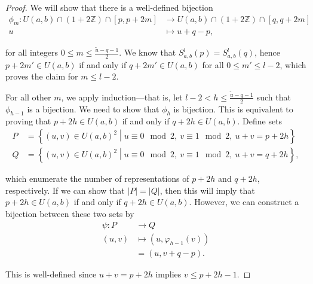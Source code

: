 \documentclass{amsart}
\newcommand{\ZZ}{\mathbb{Z}}
\theoremstyle{theorem}
\theoremstyle{definition}
\begin{document}
\begin{proof}
We will show that there is a well-defined bijection
	\begin{align*}
    \phi_m: U(a,b) \cap (1 + 2\ZZ) \cap [p, p + 2m] &\rightarrow U(a,b) \cap (1 + 2\ZZ) \cap [q, q + 2m] \\
    u &\mapsto u + q - p,
    \end{align*}
    
\noindent for all integers $0 \leq m \leq \frac{\tilde{u} - q - 1}{2}$. We know that $S^l_{a,b}(p) = S^l_{a,b}(q)$, hence $p + 2m' \in U(a,b)$ if and only if $q + 2m' \in U(a,b)$ for all $0 \leq m' \leq l - 2$, which proves the claim for $m \leq l - 2$.

For all other $m$, we apply induction---that is, let $l - 2 < h \leq \frac{\tilde{u} - q - 1}{2}$ such that $\phi_{h - 1}$ is a bijection. We need to show that $\phi_h$ is bijection. This is equivalent to proving that $p + 2h \in U(a,b)$ if and only if $q + 2h \in U(a,b)$. Define sets
	\begin{align*}
    P &= \left\{(u,v) \in U(a,b)^2 \middle|u \equiv 0 \mod 2, \  v \equiv 1 \mod 2, \ u + v = p + 2h\right\} \\
    Q &= \left\{(u,v) \in U(a,b)^2 \middle|u \equiv 0 \mod 2, \ v \equiv 1 \mod 2, \ u + v = q + 2h\right\},
    \end{align*}
    
\noindent which enumerate the number of representations of $p + 2h$ and $q + 2h$, respectively. If we can show that $|P| = |Q|$, then this will imply that $p + 2h \in U(a,b)$ if and only if $q + 2h \in U(a,b)$. However, we can construct a bijection between these two sets by
\begin{align*}
\psi: P &\rightarrow Q\\
(u,v) &\mapsto \left(u, \varphi_{h - 1}(v)\right) \\
	&= (u, v + q - p).
\end{align*}

\noindent This is well-defined since $u + v = p + 2h$ implies $v \leq p + 2h - 1$.
\end{proof}
\end{document}
